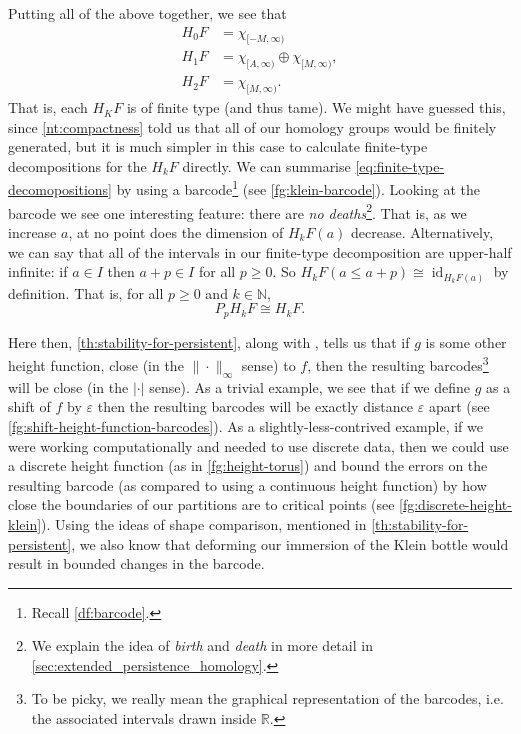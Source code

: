 \documentclass[12pt]{article}
\numberwithin{equation}{subsection}
\numberwithin{theorem}{subsection}
\numberwithin{lemma}{subsection}
\numberwithin{corollary}{subsection}
\numberwithin{definition}{subsection}
\numberwithin{example}{subsection}
\numberwithin{note}{subsection}
\newcommand{\rr}{\mathbb{R}}
\newcommand{\nn}{\mathbb{N}}
\DeclareMathOperator{\id}{id}
\newcommand{\vare}{\varepsilon}
\begin{document}
            Putting all of the above together, we see that
            \begin{align}\label{eq:finite-type-decomopositions}
                H_0F &= \chi_{[-M,\infty)}\nonumber\\
                H_1F &= \chi_{[A,\infty)} \oplus \chi_{[M,\infty)},\\
                H_2F &= \chi_{[M,\infty)}.\nonumber
            \end{align}
            That is, each $H_KF$ is of finite type (and thus tame).
            We might have guessed this, since \cref{nt:compactness} told us that all of our homology groups would be finitely generated, but it is much simpler in this case to calculate finite-type decompositions for the $H_kF$ directly.
            We can summarise \cref{eq:finite-type-decomopositions} by using a barcode\footnote{
                Recall \cref{df:barcode}.
            } (see \cref{fg:klein-barcode}).
            Looking at the barcode we see one interesting feature: there are \emph{no deaths}\footnote{
                We explain the idea of \emph{birth} and \emph{death} in more detail in \cref{sec:extended_persistence_homology}.
            }.
            That is, as we increase $a$, at no point does the dimension of $H_kF(a)$ decrease.
            Alternatively, we can say that all of the intervals in our finite-type decomposition are upper-half infinite: if $a\in I$ then $a+p\in I$ for all $p\geqslant0$.
            So $H_kF(a\leqslant a+p)\cong\id_{H_kF(a)}$ by definition.
            That is, for all $p\geqslant0$ and $k\in\nn$,
            \begin{equation}
                P_pH_kF \cong H_kF.
            \end{equation}

            Here then, \cref{th:stability-for-persistent}, along with \cite[Propositions~4.12,~4.13]{Bubenik:dn}, tells us that if $g$ is some other height function, close (in the $\|\cdot\|_\infty$ sense) to $f$, then the resulting barcodes\footnote{
                To be picky, we really mean the graphical representation of the barcodes, i.e. the associated intervals drawn inside $\rr$.
            } will be close (in the $|\cdot|$ sense).
            As a trivial example, we see that if we define $g$ as a shift of $f$ by $\vare$ then the resulting barcodes will be exactly distance $\vare$ apart (see \cref{fg:shift-height-function-barcodes}).
            As a slightly-less-contrived example, if we were working computationally and needed to use discrete data, then we could use a discrete height function (as in \cref{fg:height-torus}) and bound the errors on the resulting barcode (as compared to using a continuous height function) by how close the boundaries of our partitions are to critical points (see \cref{fg:discrete-height-klein}).
            Using the ideas of shape comparison, mentioned in \cref{th:stability-for-persistent}, we also know that deforming our immersion of the Klein bottle would result in bounded changes in the barcode.
\end{document}
